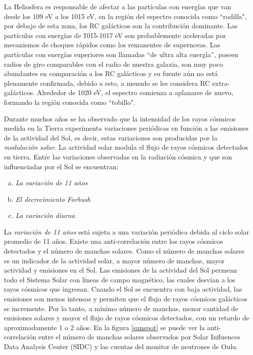 La Heliosfera es responsable de afectar a las partículas con energías que van desde los 109 eV a los 1015 eV, en la región del espectro conocida como ``rodilla", por debajo de esta zona, los RC galácticos son la contribución dominante. Las partículas con energías de \~1015-1017 eV son probablemente aceleradas por mecanismos de choques rápidos como los remanentes de supernovas.
Las partículas con energías superiores son llamadas “de ultra alta energía”, poseen radios de giro comparables con el radio de nuestra galaxia, son muy poco abundantes en comparación a los RC galácticos y su fuente aún no está plenamente confirmada, debido a esto, a menudo se les considera RC extra-galácticos. Alrededor de 1020 eV, el espectro comienza a aplanarse de nuevo, formando la región conocida como ``tobillo".

Durante muchos años se ha observado que la intensidad de los rayos cósmicos medida en la Tierra experimenta variaciones periódicas en función a las emisiones de la actividad del Sol, es decir, estas variaciones son producidas por la \emph{modulación solar}\cite{grieder}. La actividad solar modula el flujo de rayos cósmicos detectados en tierra. Entre las variaciones observadas en la radiación cósmica y que son influenciadas por el Sol se encuentran:

\begin{enumerate}[a)]
 \item \emph{La variación de 11 años}
 \item \emph{El decrecimiento Forbush}
 \item \emph{La variación diurna}
 \end{enumerate}

 
La \emph{variación de 11 años} está sujeta a una variación periódica debida al ciclo solar promedio de 11 años. Existe una anti-correlación entre los rayos cósmicos detectados y el número de manchas solares. Como el número de manchas solares es un indicador de la actividad solar, a mayor número de manchas, mayor actividad y emisiones en el Sol. Las emisiones de la actividad del Sol permean todo el Sistema Solar con líneas de campo magnético, las cuales desvían a los rayos cósmicos que ingresan. Cuando el Sol se encuentra con baja actividad, las emisiones son menos intensas y permiten que el flujo de rayos cósmicos galácticos se incremente. Por lo tanto, a mínimo número de manchas, menor cantidad de emisiones solares y mayor el flujo de rayos cósmicos detectados, con un retardo de aproximadamente 1 o 2 años\cite{stanev}. En la figura \ref{sunspot} se puede ver la anti-correlación entre el número de manchas solares observados por Solar Influences Data Analysis Center (SIDC)  y las cuentas del monitor de neutrones de Oulu.\\ 


